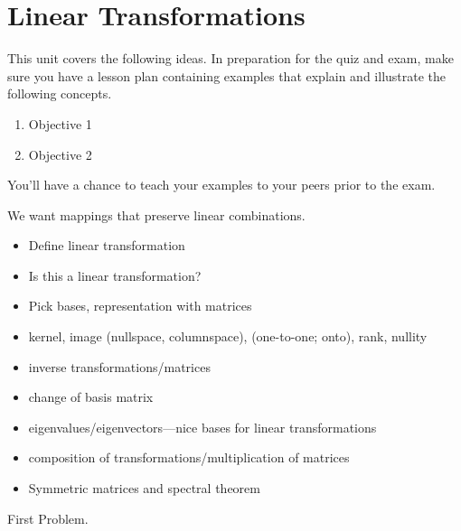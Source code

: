 \chapter{Linear Transformations}

This unit covers the following ideas. In preparation for the quiz and
exam, make sure you have a lesson plan containing examples that
explain and illustrate the following concepts.  
\begin{enumerate}
\item Objective 1
\item Objective 2
\end{enumerate}
You'll have a chance to teach your examples to your peers prior to the exam.

We want mappings that preserve linear combinations.

\begin{itemize}
\item Define linear transformation
\item Is this a linear transformation?
\item Pick bases, representation with matrices
\item kernel, image (nullspace, columnspace), (one-to-one; onto),
  rank, nullity
\item inverse transformations/matrices
\item change of basis matrix
\item eigenvalues/eigenvectors---nice bases for linear transformations
\item composition of transformations/multiplication of matrices
\item Symmetric matrices and spectral theorem
\end{itemize}

\begin{problem}
  First Problem.
\end{problem}



